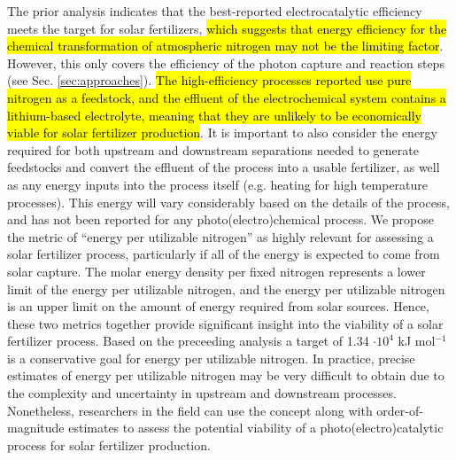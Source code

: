 The prior analysis indicates that the best-reported electrocatalytic efficiency meets the target for solar fertilizers, \hl{which suggests that energy efficiency for the chemical transformation of atmospheric nitrogen may not be the limiting factor}. However, this only covers the efficiency of the photon capture and reaction steps (see Sec. \ref{sec:approaches}). \hl{The high-efficiency processes reported use pure nitrogen as a feedstock, and the effluent of the electrochemical system contains a lithium-based electrolyte, meaning that they are unlikely to be economically viable for solar fertilizer production}. It is important to also consider the energy required for both upstream and downstream separations needed to generate feedstocks and convert the effluent of the process into a usable fertilizer, as well as any energy inputs into the process itself (e.g. heating for high temperature processes). This energy will vary considerably based on the details of the process, and has not been reported for any photo(electro)chemical process. We propose the metric of ``energy per utilizable nitrogen'' as highly relevant for assessing a solar fertilizer process, particularly if all of the energy is expected to come from solar capture. The molar energy density per fixed nitrogen represents a lower limit of the energy per utilizable nitrogen, and the energy per utilizable nitrogen is an upper limit on the amount of energy required from solar sources. Hence, these two metrics together provide significant insight into the viability of a solar fertilizer process. Based on the preceeding analysis a target of 1.34 $\cdot 10^4$ kJ mol$^{-1}$ is a conservative goal for energy per utilizable nitrogen. In practice, precise estimates of energy per utilizable nitrogen may be very difficult to obtain due to the complexity and uncertainty in upstream and downstream processes. Nonetheless, researchers in the field can use the concept along with order-of-magnitude estimates to assess the potential viability of a photo(electro)catalytic process for solar fertilizer production.


